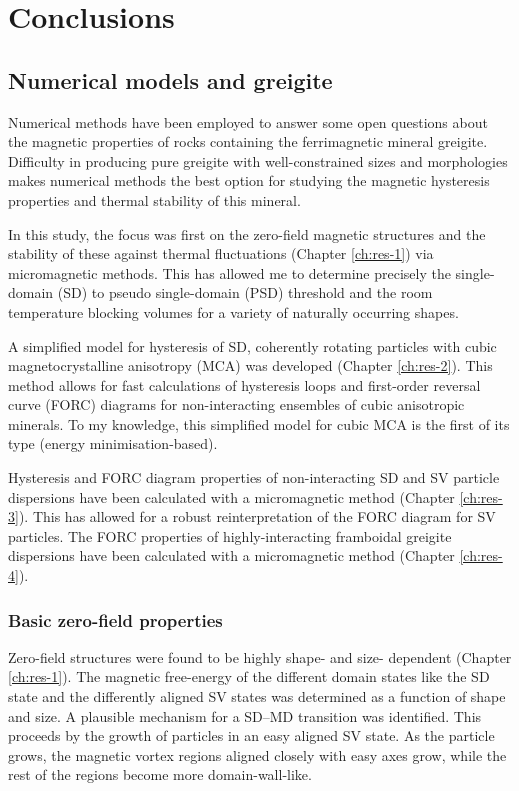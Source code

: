 \chapter{Conclusions}
\label{ch:conclusions}
\fancyhead[C]{}
\fancyhead[R]{}
\fancyfoot[C]{\thepage}

\section{Numerical models and greigite}
Numerical methods have been employed to answer some open questions about the magnetic properties of rocks containing the ferrimagnetic mineral greigite. Difficulty in producing pure greigite with well-constrained sizes and morphologies makes numerical methods the best option for studying the magnetic hysteresis properties and thermal stability of this mineral.\par

In this study, the focus was first on the zero-field magnetic structures and the stability of these against thermal fluctuations (Chapter \ref{ch:res-1}) via micromagnetic methods. This has allowed me to determine precisely the single-domain (SD) to pseudo single-domain (PSD) threshold and the room temperature blocking volumes for a variety of naturally occurring shapes.\par

A simplified model for hysteresis of SD, coherently rotating particles with cubic magnetocrystalline anisotropy (MCA) was developed (Chapter \ref{ch:res-2}). This method allows for fast calculations of hysteresis loops and first-order reversal curve (FORC) diagrams for non-interacting ensembles of cubic anisotropic minerals. To my knowledge, this simplified model for cubic MCA is the first of its type (energy minimisation-based).\par

Hysteresis and FORC diagram properties of non-interacting SD and SV particle dispersions have been calculated with a micromagnetic method \citep{OConbhui2017} (Chapter \ref{ch:res-3}). This has allowed for a robust reinterpretation of the FORC diagram for SV particles. The FORC properties of highly-interacting framboidal greigite dispersions have been calculated with a micromagnetic method \citep{OConbhui2017} (Chapter \ref{ch:res-4}).\par

\subsection{Basic zero-field properties}
Zero-field structures were found to be highly shape- and size- dependent (Chapter \ref{ch:res-1}). The magnetic free-energy of the different domain states like the SD state and the differently aligned SV states was determined as a function of shape and size. A plausible mechanism for a SD--MD transition was identified. This proceeds by the growth of particles in an easy aligned SV state. As the particle grows, the magnetic vortex regions aligned closely with easy axes grow, while the rest of the regions become more domain-wall-like.\par

